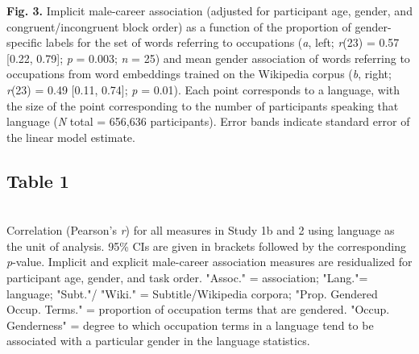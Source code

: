 \documentclass[11pt]{wlscirep}
\begin{document}
{\bf Fig. 3.} Implicit male-career association (adjusted for participant age,
gender, and congruent/incongruent block order) as a function of the proportion of gender-specific labels for the set of words referring to occupations ({\it a}, left; \emph{r}(23) = 0.57 {[}0.22, 0.79{]}; \emph{p} = 0.003; \emph{n} = 25) and  mean gender association of words
referring to occupations from word embeddings trained on the Wikipedia corpus ({\it b}, right; \emph{r}(23) = 0.49 {[}0.11, 0.74{]}; \emph{p} = 0.01). Each point corresponds to a language, with the size of the point corresponding to the number of participants
speaking that language ({\it N} total = 656,636 participants). Error bands indicate standard error of the
linear model estimate.
\subsection*{Table 1}~\\

Correlation (Pearson’s  \emph{r}) for all measures in Study 1b and 2 using language as the unit of analysis. 95\% CIs are given in brackets followed by the corresponding {\it p}-value. Implicit and explicit male-career association measures are residualized for participant age, gender, and task order. "Assoc." = association; "Lang."= language; "Subt."/ "Wiki." = Subtitle/Wikipedia corpora; "Prop. Gendered Occup. Terms." = proportion of occupation terms that are gendered. "Occup. Genderness" = degree to which occupation terms in a language tend to be associated with a particular gender in the language statistics.
\newpage
\newpage





\pagestyle{empty}
\hfill
\tiny
 
\end{document}
